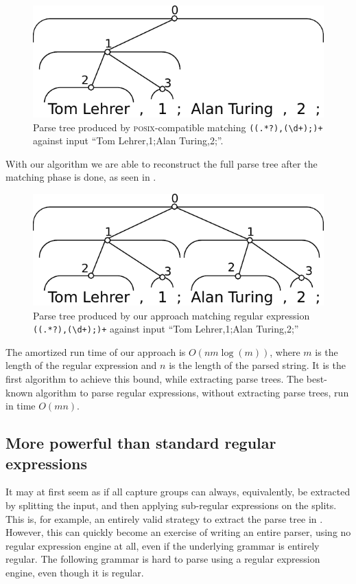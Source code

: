 \documentclass[english]{sigplanconf}
\theoremstyle{definition}
\begin{document}
\begin{figure}[htp]
\centering
\includegraphics[width=.75\linewidth]{graphs/posix_parse}
\caption{ Parse tree produced by \textsc{posix}-compatible matching \texttt{((.*?),(\textbackslash d+);)+} against input ``Tom
Lehrer,1;Alan Turing,2;''.}
\end{figure}

With our algorithm we are able to reconstruct the full parse
tree after the matching phase is done, as seen in .

\begin{figure}[htp]
\centering
\includegraphics[width=.75\linewidth]{graphs/full_parse}
\caption{ Parse tree produced by our approach matching regular expression \texttt{((.*?),(\textbackslash d+);)+} against input ``Tom
Lehrer,1;Alan Turing,2;''}
\end{figure}

The amortized run time of our approach is $O(nm\log(m))$, where $m$ is
the length of the regular expression and $n$ is the length of the
parsed string. It is the first algorithm to achieve this bound,
while extracting parse trees. The best-known algorithm to parse
regular expressions, without extracting parse trees, run in time
$O(m n)$\cite{Sedg90a}.

\subsection{More powerful than standard regular expressions}
It may at first seem as if all capture groups can always, equivalently,
be extracted by splitting the input, and then applying sub-regular
expressions on the splits.  This is, for example, an entirely valid
strategy to extract the parse tree in .  However,
this can quickly become an exercise of writing an entire parser,
using no regular expression engine at all, even if the underlying
grammar is entirely regular.  The following grammar is hard to parse
using a regular expression engine, even though it is regular.
\end{document}
